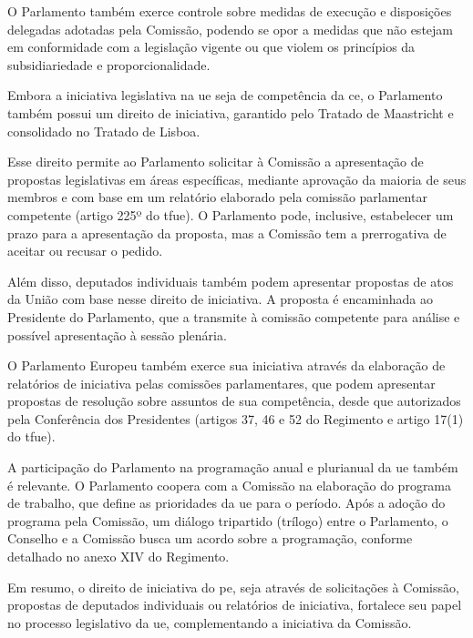 O Parlamento também exerce controle sobre medidas de execução e disposições delegadas adotadas pela Comissão, podendo se opor a medidas que não estejam em conformidade com a legislação vigente ou que violem os princípios da subsidiariedade e proporcionalidade.

Embora a iniciativa legislativa na \acrshort{ue} seja de competência da \acrshort{ce}, o Parlamento também possui um direito de iniciativa, garantido pelo Tratado de Maastricht e consolidado no Tratado de Lisboa.

Esse direito permite ao Parlamento solicitar à Comissão a apresentação de propostas legislativas em áreas específicas, mediante aprovação da maioria de seus membros e com base em um relatório elaborado pela comissão parlamentar competente (artigo 225º do \acrshort{tfue}). O Parlamento pode, inclusive, estabelecer um prazo para a apresentação da proposta, mas a Comissão tem a prerrogativa de aceitar ou recusar o pedido.

Além disso, deputados individuais também podem apresentar propostas de atos da União com base nesse direito de iniciativa. A proposta é encaminhada ao Presidente do Parlamento, que a transmite à comissão competente para análise e possível apresentação à sessão plenária.

O Parlamento Europeu também exerce sua iniciativa através da elaboração de relatórios de iniciativa pelas comissões parlamentares, que podem apresentar propostas de resolução sobre assuntos de sua competência, desde que autorizados pela Conferência dos Presidentes (artigos 37, 46 e 52 do Regimento e artigo 17(1) do \acrshort{tfue}).

A participação do Parlamento na programação anual e plurianual da \acrshort{ue} também é relevante. O Parlamento coopera com a Comissão na elaboração do programa de trabalho, que define as prioridades da \acrshort{ue} para o período. Após a adoção do programa pela Comissão, um diálogo tripartido (trílogo) entre o Parlamento, o Conselho e a Comissão busca um acordo sobre a programação, conforme detalhado no anexo XIV do Regimento.

Em resumo, o direito de iniciativa do \acrshort{pe}, seja através de solicitações à Comissão, propostas de deputados individuais ou relatórios de iniciativa, fortalece seu papel no processo legislativo da \acrshort{ue}, complementando a iniciativa da Comissão.
